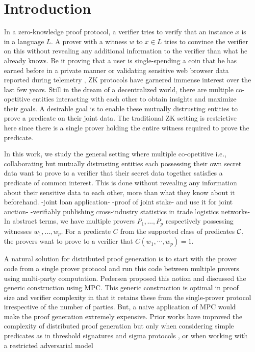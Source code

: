 \section{Introduction} \label{sec:intro}
In a zero-knowledge proof protocol, a verifier tries to verify that an instance $x$ is in a language $L$. A prover with a witness $w$ to $x \in L$ tries to convince the verifier on this without revealing any additional information to the verifier than what he already knows. Be it proving that a user is single-spending a coin that he has earned before in a private manner \cite{zerocash} or validating sensitive web browser data reported during telemetry \cite{MozillaPrio}, ZK protocols have garnered immense interest over the last few years. Still in the dream of a decentralized world, there are multiple co-opetitive entities interacting with each other to obtain insights and maximize their goals. A desirable goal is to enable these mutually distrusting entities to prove a predicate on their joint data. The traditional ZK setting is restrictive here since there is a single prover holding the entire witness required to prove the predicate. 

In this work, we study the general setting where multiple co-opetitive i.e., collaborating but mutually distrusting entities each possessing their own secret data want to prove to a verifier that their secret data together satisfies a predicate of common interest. This is done without revealing any information about their sensitive data to each other, more than what they know about it beforehand. 
-joint loan application-
-proof of joint stake- and use it for joint auction-
-verifiably publishing cross-industry statistics in trade logistics networks-
In abstract terms, we have multiple provers $P_1, \ldots, P_p$ respectively possessing witnesses $w_1, \ldots, w_p$. For a predicate $C$ from the supported class of predicates ${\cal C}$, the provers want to prove to a verifier that $C(w_1,\cdots,w_p) = 1$.

A natural solution for distributed proof generation is to start with the prover code from a single prover protocol and run this code between multiple provers using multi-party computation. Pedersen \cite{Ped92} proposed this notion and discussed the generic construction using MPC.
This generic construction is optimal in proof size and verifier complexity in that it retains these from the single-prover protocol irrespective of the number of parties. But, a naive application of MPC would make the proof generation extremely expensive.  
Prior works have improved the complexity of distributed proof generation but only when considering simple predicates as in threshold signatures \cite{} and sigma protocols \cite{KMR12}, or when working with a restricted adversarial model \cite{trinocchio}

